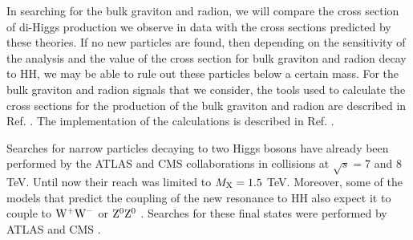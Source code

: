 In searching for the bulk graviton and radion, we will compare the cross section of di-Higgs production we observe in data with the cross sections predicted by these theories. If no new particles are found, then depending on the sensitivity of the analysis and the value of the cross section for bulk graviton and radion decay to HH, we may be able to rule out these particles below a certain mass. For the bulk graviton and radion signals that we consider, the tools used to calculate the cross sections for the production of the bulk graviton and radion are described in Ref. \cite{Agashe:2013kyb, deAquino:2011ix}. The implementation of the calculations is described in Ref. \cite{Oliveira:2014kla}.   


Searches for narrow particles decaying to two Higgs bosons have already been performed by the ATLAS \cite{Aad:2014yja, Aad:2015uka, Aad:2015xja} and CMS \cite{Khachatryan:2014jya,Khachatryan:2015year,Khachatryan:2015tha} collaborations in \Pp\Pp collisions at $\sqrt{s} = $7 and 8 TeV. Until now their reach was limited to $M_{\rm X} = 1.5$ TeV. Moreover, some of the models that predict the coupling of the new resonance to HH also expect it to couple to $\rm W^{+}\rm W^{-}$ or $\rm Z^{0}\rm Z^{0}$ \cite{Brehmer:2015dan}. Searches for these final states were performed by ATLAS and CMS \cite{ATLASVV, ATLASWV, ATLASZV, Khachatryan:2014hpa, CMSZVWV}. 


